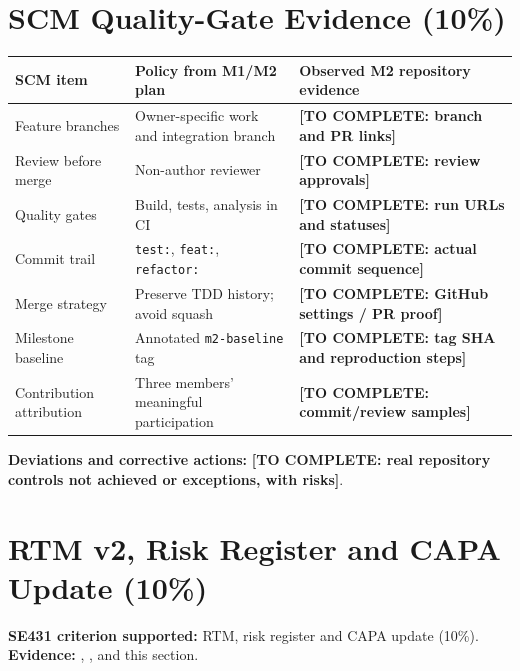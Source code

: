 \documentclass[11pt,a4paper]{article}
\newcommand{\todo}[1]{\textcolor{red!70!black}{\textbf{[TO COMPLETE: #1]}}}
\begin{document}
\section{SCM Quality-Gate Evidence (10\%)}\label{sec:scm}
\begin{longtable}{L{3.4cm} L{4.1cm} L{5.5cm}}\toprule
\textbf{SCM item} & \textbf{Policy from M1/M2 plan} & \textbf{Observed M2 repository evidence}\\\midrule\endhead
Feature branches & Owner-specific work and integration branch & \todo{branch and PR links}\\
Review before merge & Non-author reviewer & \todo{review approvals}\\
Quality gates & Build, tests, analysis in CI & \todo{run URLs and statuses}\\
Commit trail & \texttt{test:}, \texttt{feat:}, \texttt{refactor:} & \todo{actual commit sequence}\\
Merge strategy & Preserve TDD history; avoid squash & \todo{GitHub settings / PR proof}\\
Milestone baseline & Annotated \texttt{m2-baseline} tag & \todo{tag SHA and reproduction steps}\\
Contribution attribution & Three members' meaningful participation & \todo{commit/review samples}\\\bottomrule\end{longtable}
\textbf{Deviations and corrective actions:} \todo{real repository controls not achieved or exceptions, with risks}.

\section{RTM v2, Risk Register and CAPA Update (10\%)}\label{sec:rtm}
\textbf{SE431 criterion supported:} RTM, risk register and CAPA update (10\%). \textbf{Evidence:} , , and this section.
\end{document}
